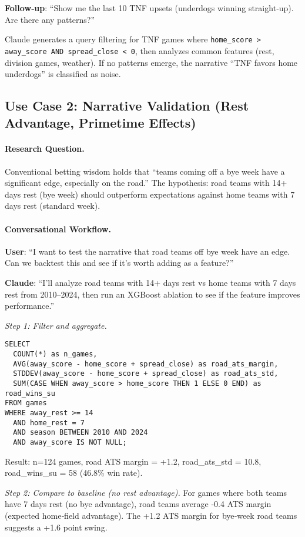 \textbf{Follow‑up}: ``Show me the last 10 TNF upsets (underdogs winning straight‑up). Are there any patterns?''

Claude generates a query filtering for TNF games where \texttt{home\_score > away\_score AND spread\_close < 0}, then analyzes common features (rest, division games, weather). If no patterns emerge, the narrative ``TNF favors home underdogs'' is classified as noise.

\subsection{Use Case 2: Narrative Validation (Rest Advantage, Primetime Effects)}
\label{subsec:use_case_narrative}

\paragraph{Research Question.}
Conventional betting wisdom holds that ``teams coming off a bye week have a significant edge, especially on the road.'' The hypothesis: road teams with 14+ days rest (bye week) should outperform expectations against home teams with 7 days rest (standard week).

\paragraph{Conversational Workflow.}
\textbf{User}: ``I want to test the narrative that road teams off bye week have an edge. Can we backtest this and see if it's worth adding as a feature?''

\textbf{Claude}: ``I'll analyze road teams with 14+ days rest vs home teams with 7 days rest from 2010--2024, then run an XGBoost ablation to see if the feature improves performance.''

\textit{Step 1: Filter and aggregate.}
\begin{verbatim}
SELECT
  COUNT(*) as n_games,
  AVG(away_score - home_score + spread_close) as road_ats_margin,
  STDDEV(away_score - home_score + spread_close) as road_ats_std,
  SUM(CASE WHEN away_score > home_score THEN 1 ELSE 0 END) as road_wins_su
FROM games
WHERE away_rest >= 14
  AND home_rest = 7
  AND season BETWEEN 2010 AND 2024
  AND away_score IS NOT NULL;
\end{verbatim}

Result: n=124 games, road ATS margin = +1.2, road\_ats\_std = 10.8, road\_wins\_su = 58 (46.8\% win rate).

\textit{Step 2: Compare to baseline (no rest advantage).}
For games where both teams have 7 days rest (no bye advantage), road teams average -0.4 ATS margin (expected home‑field advantage). The +1.2 ATS margin for bye‑week road teams suggests a +1.6 point swing.

